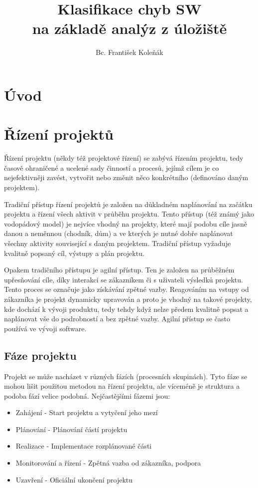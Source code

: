 \documentclass[czech,DP]{thesiskiv}
\author{Bc. František Koleňák}
\title{Klasifikace chyb SW \\na základě analýz z úložiště}
\begin{document}
%
\maketitle
\tableofcontents

\chapter{Úvod}
 
\newpage

\chapter{Řízení projektů}
Řízení projektu (někdy též projektové řízení) se zabývá řízením projektu, tedy časově ohraničené a ucelené sady činností a procesů, jejímž cílem je co nejefektivněji zavést, vytvořit nebo změnit něco konkrétního (definováno daným projektem).

Tradiční přístup řízení projektů je založen na důkladném naplánování na začátku projektu a řízení všech aktivit v průběhu projektu. Tento přístup (též známý jako vodopádový model) je nejvíce vhodný na projekty, které mají podobu cíle jasně danou a neměnnou (chodník, dům) a ve kterých je nutné dobře naplánovat všechny aktivity související s daným projektem. Tradiční přístup vyžaduje kvalitně popsaný cíl, výstupy a plán projektu.

Opakem tradičního přístupu je agilní přístup. Ten je založen na průběžném upřesňování cíle, díky interakci se zákazníkem či s uživateli výsledků projektu. Tento proces se označuje jako získávání zpětné vazby. Reagováním na vstupy od zákazníka je projekt dynamicky upravován a proto je vhodný na takové projekty, kde dochází k vývoji produktu, tedy tehdy když nelze předem kvalitně popsat a naplánovat vše do podrobností a bez zpětné vazby. Agilní přístup se často používá ve vývoji software.

\section{Fáze projektu}
Projekt se může nacházet v různých fázích (procesních skupinách). Tyto fáze se mohou lišit použitou metodou na řízení projektu, ale víceméně je struktura a podoba fází velice podobná. Nejčastějšími fázemi jsou:

\begin{itemize}
	\item {Zahájení} - Start projektu a vytyčení jeho mezí
	\item {Plánování} - Plánování částí projektu
	\item {Realizace} - Implementace rozplánované části
	\item {Monitorování a řízení} - Zpětná vazba od zákazníka, podpora
	\item {Uzavření} - Oficiální ukončení projektu
\end{itemize}
\end{document}

